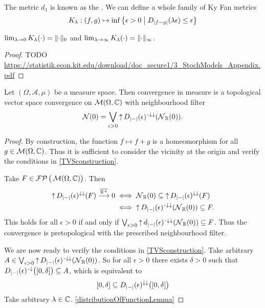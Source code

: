 \begin{definition}
The metric $d_1$ is known as the . We can define a whole family of Ky Fan metrics
\[ K_\lambda: (f,g) \mapsto \inf\setbuilder[\big]{\epsilon > 0}{D_{|f-g|}(\lambda\epsilon) \leq \epsilon} \]
\end{definition}

\begin{proposition}
$\lim_{\lambda\to 0}K_\lambda(\cdot) = \lVert\cdot\rVert_0$ and $\lim_{\lambda\to \infty}K_\lambda(\cdot) = \lVert\cdot\rVert_\infty$.
\end{proposition}
\begin{proof}
TODO \url{https://statistik.econ.kit.edu/download/doc_secure1/3_StochModels_Appendix.pdf}
\end{proof}

\begin{lemma}
Let $(\Omega, \mathcal{A}, \mu)$ be a measure space. Then convergence in measure is a topological vector space convergence on $\operatorname{\mathcal{M}}(\Omega,\mathbb{C})$ with neighbourhood filter
\[ \operatorname{\mathcal{N}}(0) = \bigvee_{\epsilon > 0}\operatorname{\uparrow} D_{|-|}(\epsilon)^{{\text{\hspace{0.15em}-}\downarrow}\downarrow}(\operatorname{\mathcal{N}}_{\mathbb{R}}(0)). \]
\end{lemma}
\begin{proof}
By construction, the function $f\mapsto f+g$ is a homeomorphism for all $g\in \operatorname{\mathcal{M}}(\Omega, \mathbb{C})$. Thus it is sufficient to consider the vicinity at the origin and verify the conditions in \ref{TVSconstruction}.

Take $F\in\operatorname{\mathcal{FP}}\big(\operatorname{\mathcal{M}}(\Omega,\mathbb{C})\big)$. Then
\begin{align*}
\operatorname{\uparrow} D_{|-|}(\epsilon)^{\downarrow\downarrow}(F) \overset{\overline{\mathbb{R}^+}}{\longrightarrow} 0 &\iff \operatorname{\mathcal{N}}_{\mathbb{R}}(0) \subseteq \operatorname{\uparrow} D_{|-|}(\epsilon)^{\downarrow\downarrow}(F) \\
&\iff \operatorname{\uparrow} D_{|-|}(\epsilon)^{{\text{\hspace{0.15em}-}\downarrow}\downarrow}(\operatorname{\mathcal{N}}_{\mathbb{R}}(0)) \subseteq F.
\end{align*}
This holds for all $\epsilon > 0$ if and only if $\bigvee_{\epsilon>0}\operatorname{\uparrow} d_{|-|}(\epsilon)^{{\text{\hspace{0.15em}-}\downarrow}\downarrow}(\operatorname{\mathcal{N}}_{\mathbb{R}}(0)) \subseteq F$. Thus the convergence is pretopological with the prescribed neighbourhood filter.

We are now ready to verify the conditions in \ref{TVSconstruction}. Take arbitrary $A\in \bigvee_{\epsilon>0}\operatorname{\uparrow} D_{|-|}(\epsilon)^{{\text{\hspace{0.15em}-}\downarrow}\downarrow}(\operatorname{\mathcal{N}}_{\mathbb{R}}(0))$. So for all $\epsilon > 0$ there exists $\delta > 0$ such that $D_{|-|}(\epsilon)^{\preimf}\big(\interval{0,\delta}\big) \subseteq A$, which is equivalent to
\[ \interval{0,\delta} \subseteq D_{|-|}(\epsilon)^{\imf\imf}\big(\interval{0,\delta}\big) \]
Take arbitrary $\lambda\in \mathbb{C}$. \ref{distributionOfFunctionLemma}
\end{proof}

